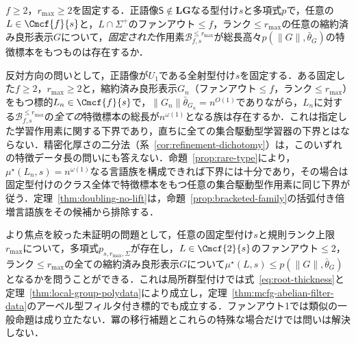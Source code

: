 \begin{openproblem}[高ファンアウトでの特徴データ長]
\label{op:fanout-two}
$f\ge2$，$r_{\max}\ge2$を固定する．正語像$\mathsf S\notin\mathbf{LG}$なる型付け$s$と多項式$p$で，任意の$L\in\Cmcf{f}{s}$と，$L\cap\Sigma^+$のファンアウト$\le f$，ランク$\le r_{\max}$の任意の縮約済み良形表示$G$について，\emph{固定された}作用素$\mathcal B^{\le r_{\max}}_{f,s}$が総長高々$p(\|G\|,\bar\theta_G)$の特徴標本をもつものは存在するか．

反対方向の問いとして，正語像が$U_1$である全射型付け$s$を固定する．ある固定した$f\ge2$，$r_{\max}\ge2$と，縮約済み良形表示$G_n$（ファンアウト$\le f$，ランク$\le r_{\max}$）をもつ標的$L_n\in\Cmcf{f}{s}$で，$\|G_n\|\bar\theta_{G_n}=n^{O(1)}$でありながら，$L_n$に対する$\mathcal B^{\le r_{\max}}_{f,s}$の\emph{全ての}特徴標本の総長が$n^{\omega(1)}$となる族は存在するか．これは指定した学習作用素に関する下界であり，直ちに全ての集合駆動型学習器の下界とはならない．精密化厚さの二分法（系~\ref{cor:refinement-dichotomy}）は，このいずれの特徴データ長の問いにも答えない．命題~\ref{prop:rare-type}により，$\mu^\star(L_n,s)=n^{\omega(1)}$なる言語族を構成できれば下界には十分であり，その場合は固定型付けのクラス全体で特徴標本をもつ任意の集合駆動型作用素に同じ下界が従う．定理~\ref{thm:doubling-no-lift}は，命題~\ref{prop:bracketed-family}の括弧付き倍増言語族をその候補から排除する．
\end{openproblem}

より焦点を絞った未証明の問題として，任意の固定型付け$s$と規則ランク上限$r_{\max}$について，多項式$p_{s,r_{\max},\Sigma}$が存在し，$L\in\Cmcf{2}{s}$のファンアウト$\le2$，ランク$\le r_{\max}$の全ての縮約済み良形表示$G$について$\mu^\star(L,s)\le p(\|G\|,\bar\theta_G)$となるかを問うことができる．これは局所群型付けでは式~\eqref{eq:root-thickness}と定理~\ref{thm:local-group-polydata}により成立し，定理~\ref{thm:mcfg-abelian-filter-data}のアーベル型フィルタ付き標的でも成立する．ファンアウト1では類似の一般命題は成り立たない．冪の移行補題とこれらの特殊な場合だけでは問いは解決しない．

